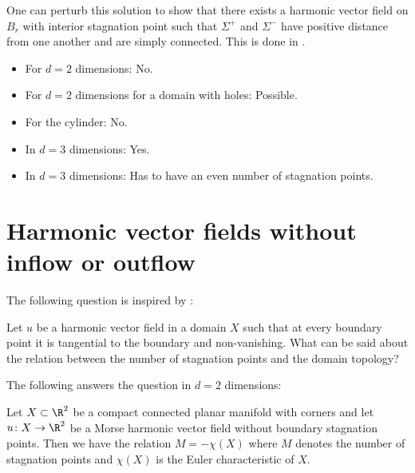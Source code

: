 \begin{frame}
  One can perturb this solution to show that there exists a harmonic vector field
  on $B_r$ with interior stagnation point such that $\Sigma^+$ and $\Sigma^-$ have positive distance
  from one another and are simply connected.
  This is done in \autocite[Ex.\ 5.12]{Koppenhoefer2024}.
\end{frame}

\begin{frame}
  \questionFlowthrough
  \begin{answer}
    \begin{itemize}
      \item For $d=2$ dimensions: No.
      \item For $d=2$ dimensions for a domain with holes: Possible.
      \item For the cylinder: No.
      \item In $d=3$ dimensions: Yes.
      \item In $d=3$ dimensions: Has to have an even number of stagnation points.
    \end{itemize}
  \end{answer}
\end{frame}

\section{Harmonic vector fields without inflow or outflow}

\begin{frame}
  The following question is inspired by \autocite{Lortz1970}:
  \begin{question}
    Let $u$ be a harmonic vector field in a domain $X$ such that at every boundary point it is tangential to the boundary
    and non-vanishing.
    What can be said about the relation between the number of stagnation points and the domain topology?
  \end{question}
\end{frame}

\begin{frame}
  The following answers the question in $d=2$ dimensions:
  \begin{proposition}\label{pr:n2_hvf_noInflowNoOutflow}
    Let $X\subset\R^2$ be a compact connected planar manifold with corners
    and let $u\colon X\to\R^2$ be
    a Morse harmonic vector field without boundary stagnation points.
    Then we have the relation $M=-\chi(X)$ where $M$ denotes the number of stagnation points and
    $\chi(X)$ is the Euler characteristic of $X$.
  \end{proposition}
\end{frame}

